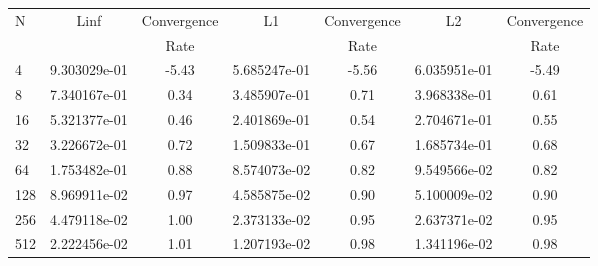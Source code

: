 \documentclass[12pt]{article}
\begin{document}
	\begin{tabular}{l|c|c|c|c|c|c}
		N&Linf&Convergence&L1&Convergence&L2&Convergence\\
		&&Rate&&Rate&&Rate\\
		\hline
		4&9.303029e-01&-5.43&5.685247e-01&-5.56&6.035951e-01&-5.49\\
		\hline
		8&7.340167e-01&0.34&3.485907e-01&0.71&3.968338e-01&0.61\\
		\hline
		16&5.321377e-01&0.46&2.401869e-01&0.54&2.704671e-01&0.55\\
		\hline
		32&3.226672e-01&0.72&1.509833e-01&0.67&1.685734e-01&0.68\\
		\hline
		64&1.753482e-01&0.88&8.574073e-02&0.82&9.549566e-02&0.82\\
		\hline
		128&8.969911e-02&0.97&4.585875e-02&0.90&5.100009e-02&0.90\\
		\hline
		256&4.479118e-02&1.00&2.373133e-02&0.95&2.637371e-02&0.95\\
		\hline
		512&2.222456e-02&1.01&1.207193e-02&0.98&1.341196e-02&0.98\\
	\end{tabular}
\end{document}
